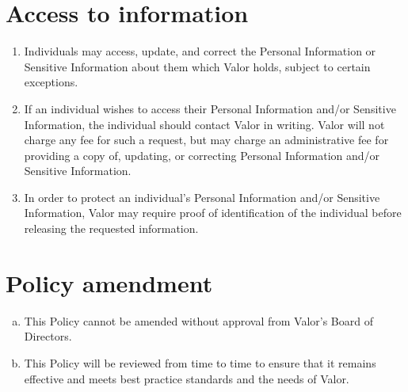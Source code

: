 \documentclass[10pt]{article}
\begin{document}
\section{Access to information}
\begin{enumerate}[(1)]
\item
Individuals may access, update, and correct the Personal Information or Sensitive Information about them which Valor holds, subject to certain exceptions.

\item
If an individual wishes to access their Personal Information and/or Sensitive Information, the individual should contact Valor in writing. Valor will not charge any fee for such a request, but may charge an administrative fee for providing a copy of, updating, or correcting Personal Information and/or Sensitive Information.

\item
In order to protect an individual's Personal Information and/or Sensitive Information, Valor may require proof of identification of the individual before releasing the requested information.
\end{enumerate}


\section{Policy amendment}
\begin{enumerate}[(a)]
\item
This Policy cannot be amended without approval from Valor's Board of Directors.

\item
This Policy will be reviewed from time to time to ensure that it remains effective and meets best practice standards and the needs of Valor.
\end{enumerate}
\end{document}
